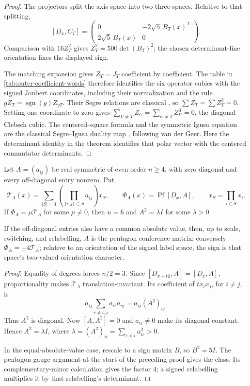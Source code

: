 \begin{proof}
The projectors split the axis space into two three-spaces.  Relative to that
splitting,
\[
 [D_x,C_T]=
 \begin{pmatrix}
 0&-2\sqrt5\,B_T(x)^{\mathsf T}\\
 2\sqrt5\,B_T(x)&0
 \end{pmatrix}.
\]
Comparison with \(16Z_T^2\) gives
\(Z_T^2=500\det(B_T)^2\); the chosen determinant-line orientation fixes the
displayed sign.

The matching expansion gives \(Z_T=J_T\) coefficient by coefficient.
The table in \eqref{tab:outer-coefficient-words} therefore identifies the six operator cubics with the signed
Joubert coordinates, including their normalization and the rule
\(gZ_T=\operatorname{sgn}(g)Z_{gT}\).  Their Segre relations are classical
\cite[Sections~2.1--2.2]{HMSVOuter}, so
\(\sum Z_T=\sum Z_T^3=0\).  Setting one coordinate to zero gives
\(\sum_{U\ne T}Z_U=\sum_{U\ne T}Z_U^3=0\), the diagonal Clebsch cubic.
The centered-square formula and the symmetric Igusa equation are the
classical Segre--Igusa duality map \cite[Section~2.2]{HMSVOuter}, following
van der Geer.  Here the determinant identity in the theorem identifies that
polar vector with the centered commutator determinants.
\end{proof}

\begin{theorem}
\label{thm:triangle-pfaffian-recognition}
Let \(A=(a_{ij})\) be real symmetric of even order \(n\geq4\), with zero
diagonal and every off-diagonal entry nonzero.  Put
\[
 \mathcal T_A(x)=\sum_{|S|=3}
 \left(\prod_{\{i,j\}\subset S}a_{ij}\right)x_S,
 \qquad
 \Phi_A(x)=\operatorname{Pf}[D_x,A],
 \qquad x_S=\prod_{i\in S}x_i.
\]
If \(\Phi_A=\mu\mathcal T_A\) for some \(\mu\ne0\), then \(n=6\) and
\(A^2=\lambda I\) for some \(\lambda>0\).

If the off-diagonal entries also have a common absolute value, then, up to scale, switching,
and relabelling, \(A\) is the pentagon conference matrix; conversely
\(\Phi_A=\pm4\mathcal T_A\); relative to an orientation of the signed label space,
the sign is that space's two-valued orientation character.
\end{theorem}

\begin{proof}
Equality of degrees forces \(n/2=3\).  Since
\([D_{x+t\mathbf1},A]=[D_x,A]\), proportionality makes \(\mathcal T_A\)
translation-invariant.  Its coefficient of \(tx_ix_j\), for \(i\ne j\), is
\[
 a_{ij}\sum_{r\ne i,j}a_{ir}a_{rj}=a_{ij}(A^2)_{ij}.
\]
Thus \(A^2\) is diagonal.  Now \([A,A^2]=0\) and \(a_{ij}\ne0\) make its
diagonal constant.  Hence \(A^2=\lambda I\), where
\(\lambda=(A^2)_{ii}=\sum_{r\ne i}a_{ir}^2>0\).

In the equal-absolute-value case, rescale to a sign matrix \(B\), so
\(B^2=5I\).  The pentagon gauge argument at the start of the preceding proof
gives the class.  Its complementary-minor calculation gives the factor \(4\);
a signed relabelling multiplies it by that relabelling's determinant.
\end{proof}

